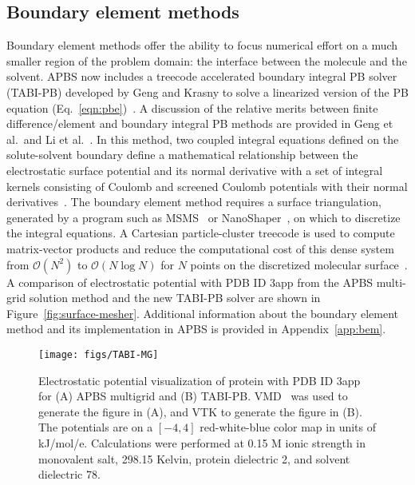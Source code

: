 \documentclass[12pt,titlepage]{article}
\newcommand{\revision}[1]{#1}
\begin{document}
\subsection{Boundary element methods} \label{sec:bem}
\revision{Boundary element methods offer the ability to focus numerical effort on a much smaller region of the problem domain:  the interface between the molecule and the solvent.
APBS now includes a treecode accelerated boundary integral PB solver (TABI-PB) developed by Geng and Krasny to solve a linearized version of the PB equation (Eq.~\ref{eqn:pbe})~\cite{Geng2013}.
A discussion of the relative merits between finite difference/element and boundary integral PB methods are provided in Geng et al.\ and Li et al.~\cite{Geng2013,Li2009}.}
In this method, two coupled integral equations defined on the solute-solvent boundary define a mathematical relationship between the electrostatic surface potential and its normal derivative with a set of integral kernels consisting of Coulomb and screened Coulomb potentials with their normal derivatives~\cite{Juffer1991}.
The boundary element method requires a surface triangulation, generated by a program such as MSMS~\cite{Sanner1995} or NanoShaper~\cite{Decherchi2013}, on which to discretize the integral equations.
A Cartesian particle-cluster treecode is used to compute matrix-vector products and reduce the computational cost of this dense system from $\mathcal{O}(N^2)$ to $\mathcal{O}(N\log N)$ for $N$ points on the discretized molecular surface~\cite{Li2009, Juffer1991}.
A comparison of electrostatic potential with PDB ID 3app from the APBS multi-grid solution method and the new TABI-PB solver are shown in Figure~\ref{fig:surface-mesher}.
Additional information about the boundary element method and its implementation in APBS is provided in Appendix~\ref{app:bem}.
\begin{figure}
	\centering
	\texttt{[image: figs/TABI-MG]} 
	\caption{Electrostatic potential visualization of protein with PDB ID 3app for (A) APBS multigrid and (B) TABI-PB. VMD~\cite{Humphrey1996} was used to generate the figure in (A), and VTK to generate the figure in (B). The potentials are on a $[-4, 4]$ red-white-blue color map in units of kJ/mol/e.
		Calculations were performed at 0.15 M ionic strength in monovalent salt, 298.15 Kelvin, protein dielectric 2, and solvent dielectric 78.
	}
	\label{fig:tabi-mg-comparison}
\end{figure}
\end{document}
